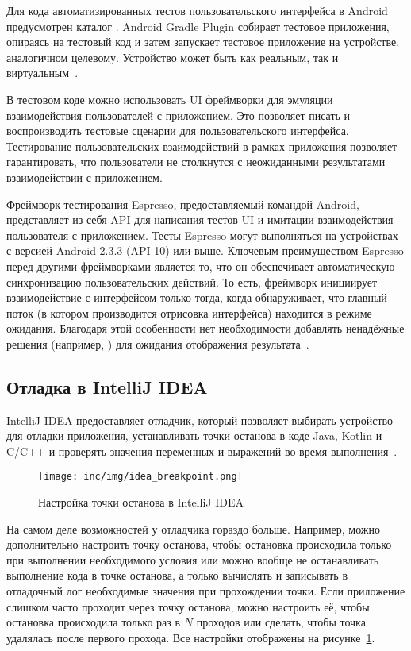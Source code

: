 Для кода автоматизированных тестов пользовательского интерфейса в Android предусмотрен каталог .
Android Gradle Plugin собирает тестовое приложения, опираясь на тестовый код и затем запускает тестовое приложение на устройстве, аналогичном целевому.
Устройство может быть как реальным, так и виртуальным~\cite{android:uiTesting}.

В тестовом коде можно использовать UI фреймворки для эмуляции взаимодействия пользователей с приложением.
Это позволяет писать и воспроизводить тестовые сценарии для пользовательского интерфейса.
Тестирование пользовательских взаимодействий в рамках приложения позволяет гарантировать, что пользователи не столкнутся с неожиданными результатами взаимодействии с приложением.

Фреймворк тестирования Espresso, предоставляемый командой Android, представляет из себя API для написания тестов UI и имитации взаимодействия пользователя с приложением.
Тесты Espresso могут выполняться на устройствах с версией Android 2.3.3 (API 10) или выше.
Ключевым преимуществом Espresso перед другими фреймворками является то, что он обеспечивает автоматическую синхронизацию пользовательских действий.
То есть, фреймворк инициирует взаимодействие с интерфейсом только тогда, когда обнаруживает, что главный поток (в котором производится отрисовка интерфейса) находится в режиме ожидания.
Благодаря этой особенности нет необходимости добавлять ненадёжные решения (например, ) для ожидания отображения результата~\cite{androidTesting}.

\subsection{Отладка в IntelliJ IDEA}
\label{subsec:debug}

IntelliJ IDEA предоставляет отладчик, который позволяет выбирать устройство для отладки приложения, устанавливать точки останова в коде Java, Kotlin и C/C++ и проверять значения переменных и выражений во время выполнения~\cite{android:debug}.

\begin{figure}[ht]
  \texttt{[image: inc/img/idea\_breakpoint.png]}
  \caption{Настройка точки останова в IntelliJ IDEA}
  \label{fig:breakpoint}
\end{figure}

На самом деле возможностей у отладчика гораздо больше.
Например, можно дополнительно настроить точку останова, чтобы остановка происходила только при выполнении необходимого условия или можно вообще не останавливать выполнение кода в точке останова, а только вычислять и записывать в отладочный лог необходимые значения при прохождении точки.
Если приложение слишком часто проходит через точку останова, можно настроить её, чтобы остановка происходила только раз в $N$ проходов или сделать, чтобы точка удалялась после первого прохода.
Все настройки отображены на рисунке~\ref{fig:breakpoint}.


